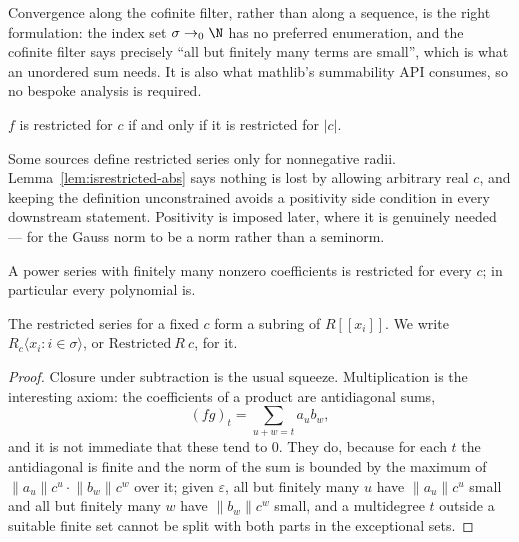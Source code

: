 Convergence along the cofinite filter, rather than along a sequence, is the right formulation:
the index set $\sigma \to_0 \N$ has no preferred enumeration, and the cofinite filter says
precisely ``all but finitely many terms are small'', which is what an unordered sum needs.  It
is also what mathlib's summability API consumes, so no bespoke analysis is required.

\begin{lemma}
  \label{lem:isrestricted-abs}
  \leanok
  $f$ is restricted for $c$ if and only if it is restricted for $\lvert c \rvert$.
\end{lemma}

Some sources define restricted series only for nonnegative radii.  Lemma~\ref{lem:isrestricted-abs}
says nothing is lost by allowing arbitrary real $c$, and keeping the definition unconstrained
avoids a positivity side condition in every downstream statement.  Positivity is imposed later,
where it is genuinely needed --- for the Gauss norm to be a norm rather than a seminorm.

\begin{lemma}
  \label{lem:isrestricted-finite-support}
  \leanok
  A power series with finitely many nonzero coefficients is restricted for every $c$; in
  particular every polynomial is.
\end{lemma}

\begin{proposition}
  \label{prop:restricted-ring}
  \leanok
  The restricted series for a fixed $c$ form a subring of $R[[x_i]]$.  We write $R_c\langle x_i :
  i \in \sigma\rangle$, or $\mathrm{Restricted}\ R\ c$, for it.
\end{proposition}

\begin{proof}
  \leanok
  Closure under subtraction is the usual squeeze.  Multiplication is the interesting axiom: the
  coefficients of a product are antidiagonal sums,
  \[
    (fg)_t = \sum_{u + w = t} a_u b_w ,
  \]
  and it is not immediate that these tend to $0$.  They do, because for each $t$ the
  antidiagonal is finite and the norm of the sum is bounded by the maximum of $\lVert a_u
  \rVert c^u \cdot \lVert b_w \rVert c^w$ over it; given $\varepsilon$, all but finitely many
  $u$ have $\lVert a_u\rVert c^u$ small and all but finitely many $w$ have $\lVert b_w \rVert
  c^w$ small, and a multidegree $t$ outside a suitable finite set cannot be split with both
  parts in the exceptional sets.
\end{proof}

